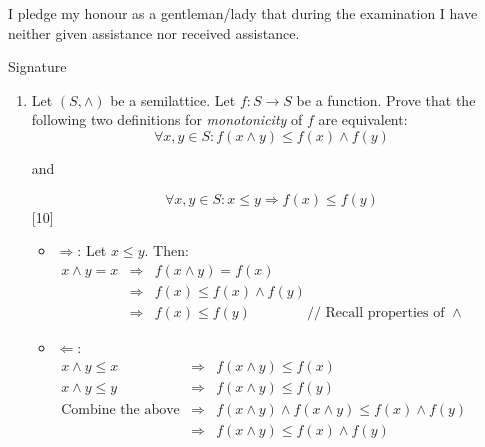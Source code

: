 \documentclass[12pt]{article}
\newcommand{\answer}[1]{{{\blue #1}}}
\begin{document}
\vspace*{4mm} I pledge my honour as a gentleman/lady that
during the examination I have neither given assistance nor
received assistance.

\vspace*{1cm}
Signature


\clearpage
\clearpage
\begin{enumerate}
\item Let $(S, \wedge)$ be a semilattice. Let $f: S
  \rightarrow S$ be a function. Prove that the following
  two definitions for {\em monotonicity} of  $f$ are
  equivalent:
  $$\forall x,y \in S: f(x \wedge y) \leq f(x) \wedge
  f(y)$$
  \begin{center} and \end{center}
  $$\forall x,y \in S: x\leq y \Rightarrow f(x) \leq f(y) $$
  \hfill[10]
\answer{
  \begin{itemize}
  \item $\Rightarrow$: Let $x \leq y$. Then:\\
    $\begin{array}{rcl}
    x \wedge y = x &\Rightarrow& f(x \wedge y) = f(x) \\
    & \Rightarrow & f(x) \leq f(x) \wedge f(y) \\
    & \Rightarrow & f(x) \leq f(y) \qquad\qquad \mbox{// Recall properties of
      } \wedge
  \end{array}$
  \item $\Leftarrow$: \\
    $\begin{array}{rcl}
    x \wedge y \leq x &\Rightarrow& f(x \wedge y) \leq f(x) \\
    x \wedge y \leq y &\Rightarrow& f(x \wedge y) \leq f(y) \\
    \mbox{Combine the above} & \Rightarrow & f(x \wedge y) \wedge f(x \wedge y) \leq f(x) \wedge f(y) \\
    & \Rightarrow & f(x \wedge y) \leq f(x) \wedge f(y) 
  \end{array}$
  \end{itemize}
}
\clearpage


\end{enumerate}
\end{document}
